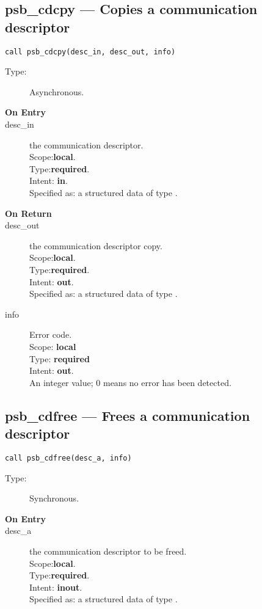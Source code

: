 %
%
\clearpage\subsection{psb\_cdcpy --- Copies a communication descriptor}

\begin{verbatim}
call psb_cdcpy(desc_in, desc_out, info)
\end{verbatim}

\begin{description}
\item[Type:] Asynchronous.
\item[\bf On Entry]
\item[desc\_in] the communication descriptor.\\
Scope:{\bf local}.\\
Type:{\bf required}.\\
Intent: {\bf in}.\\
Specified as: a structured data of type \descdata.

\end{description}

\begin{description}
\item[\bf On Return]
\item[desc\_out] the communication descriptor copy.\\
Scope:{\bf local}.\\
Type:{\bf required}.\\
Intent: {\bf out}.\\
Specified as: a structured data of type \descdata.
\item[info] Error code.\\
Scope: {\bf local} \\
Type: {\bf required} \\
Intent: {\bf out}.\\
An integer value; 0 means no error has been detected. 
\end{description}


%
%
\clearpage\subsection{psb\_cdfree --- Frees a communication descriptor}

\begin{verbatim}
call psb_cdfree(desc_a, info)
\end{verbatim}

\begin{description}
\item[Type:] Synchronous.
\item[\bf On Entry]
\item[desc\_a] the communication descriptor to be freed.\\
Scope:{\bf local}.\\
Type:{\bf required}.\\
Intent: {\bf inout}.\\
Specified as: a structured data of type \descdata.
\end{description}

